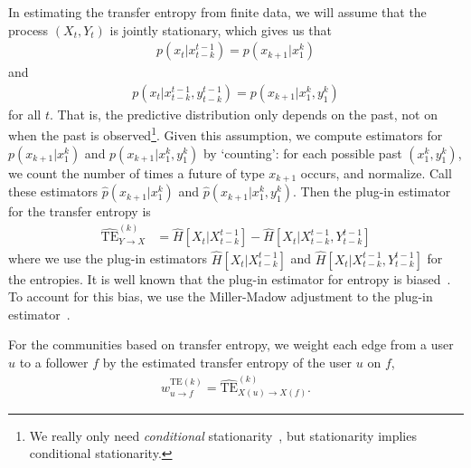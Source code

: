 In estimating the transfer entropy from finite data, we will assume that the process $(X_{t}, Y_{t})$ is jointly stationary, which gives us that
\begin{align}
	p(x_{t} | x_{t-k}^{t-1}) = p(x_{k+1} | x_{1}^{k})
\end{align}
and
\begin{align}
	p(x_{t} | x_{t-k}^{t-1}, y_{t-k}^{t-1}) = p(x_{k+1} | x_{1}^{k}, y_{1}^{k})
\end{align}
for all $t$. That is, the predictive distribution only depends on the past, not on when the past is observed\footnote{We really only need \emph{conditional} stationarity~\cite{caires2003nonparametric}, but stationarity implies conditional stationarity.}. Given this assumption, we compute estimators for $p(x_{k+1} | x_{1}^{k})$ and $p(x_{k+1} | x_{1}^{k}, y_{1}^{k})$ by `counting': for each possible past $(x_{1}^{k}, y_{1}^{k})$, we count the number of times a future of type $x_{k+1}$ occurs, and normalize. Call these estimators $\hat{p}(x_{k+1} | x_{1}^{k})$ and $\hat{p}(x_{k+1} | x_{1}^{k}, y_{1}^{k})$. Then the plug-in estimator for the transfer entropy is
\begin{align}
	\widehat{\text{TE}}_{Y \to X}^{(k)} &= \hat{H}\left[X_{t} | X_{t-k}^{t-1}\right] - \hat{H}\left[X_{t} | X_{t-k}^{t-1}, Y_{t-k}^{t-1}\right]
\end{align}
where we use the plug-in estimators $\hat{H}\left[X_{t} | X_{t-k}^{t-1}\right]$ and $\hat{H}\left[X_{t} | X_{t-k}^{t-1}, Y_{t-k}^{t-1}\right]$ for the entropies. It is well known that the plug-in estimator for entropy is biased~\cite{paninski2003estimation}. To account for this bias, we use the Miller-Madow adjustment to the plug-in estimator~\cite{miller1955note}.

For the communities based on transfer entropy, we weight each edge from a user $u$ to a follower $f$ by the estimated transfer entropy of the user $u$ on $f$, 
\begin{align}
	w_{u \to f}^{\text{TE}(k)} = \widehat{\text{TE}}_{X(u) \to X(f)}^{(k)}.
\end{align}

